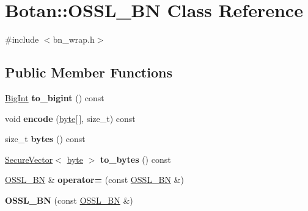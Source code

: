 \hypertarget{classBotan_1_1OSSL__BN}{\section{Botan\-:\-:O\-S\-S\-L\-\_\-\-B\-N Class Reference}
\label{classBotan_1_1OSSL__BN}
}


{\ttfamily \#include $<$bn\-\_\-wrap.\-h$>$}

\subsection*{Public Member Functions}
\begin{DoxyCompactItemize}
\item 
\hypertarget{classBotan_1_1OSSL__BN_a64d792e588635333965e979d7e2b0695}{\hyperlink{classBotan_1_1BigInt}{Big\-Int} {\bfseries to\-\_\-bigint} () const }\label{classBotan_1_1OSSL__BN_a64d792e588635333965e979d7e2b0695}

\item 
\hypertarget{classBotan_1_1OSSL__BN_af014018da5910267943a29aa9249c11b}{void {\bfseries encode} (\hyperlink{namespaceBotan_a7d793989d801281df48c6b19616b8b84}{byte}\mbox{[}$\,$\mbox{]}, size\-\_\-t) const }\label{classBotan_1_1OSSL__BN_af014018da5910267943a29aa9249c11b}

\item 
\hypertarget{classBotan_1_1OSSL__BN_a371f59c7b7d864293f43367c99bd58be}{size\-\_\-t {\bfseries bytes} () const }\label{classBotan_1_1OSSL__BN_a371f59c7b7d864293f43367c99bd58be}

\item 
\hypertarget{classBotan_1_1OSSL__BN_ae2417997cfe404ed3d9b95759d5eebda}{\hyperlink{classBotan_1_1SecureVector}{Secure\-Vector}$<$ \hyperlink{namespaceBotan_a7d793989d801281df48c6b19616b8b84}{byte} $>$ {\bfseries to\-\_\-bytes} () const }\label{classBotan_1_1OSSL__BN_ae2417997cfe404ed3d9b95759d5eebda}

\item 
\hypertarget{classBotan_1_1OSSL__BN_afb612dcbbdece82bd824996ef4476b2d}{\hyperlink{classBotan_1_1OSSL__BN}{O\-S\-S\-L\-\_\-\-B\-N} \& {\bfseries operator=} (const \hyperlink{classBotan_1_1OSSL__BN}{O\-S\-S\-L\-\_\-\-B\-N} \&)}\label{classBotan_1_1OSSL__BN_afb612dcbbdece82bd824996ef4476b2d}

\item 
\hypertarget{classBotan_1_1OSSL__BN_a748ff57c7b5b3d5a36a6354fa53c7319}{{\bfseries O\-S\-S\-L\-\_\-\-B\-N} (const \hyperlink{classBotan_1_1OSSL__BN}{O\-S\-S\-L\-\_\-\-B\-N} \&)}\label{classBotan_1_1OSSL__BN_a748ff57c7b5b3d5a36a6354fa53c7319}


\end{DoxyCompactItemize}
